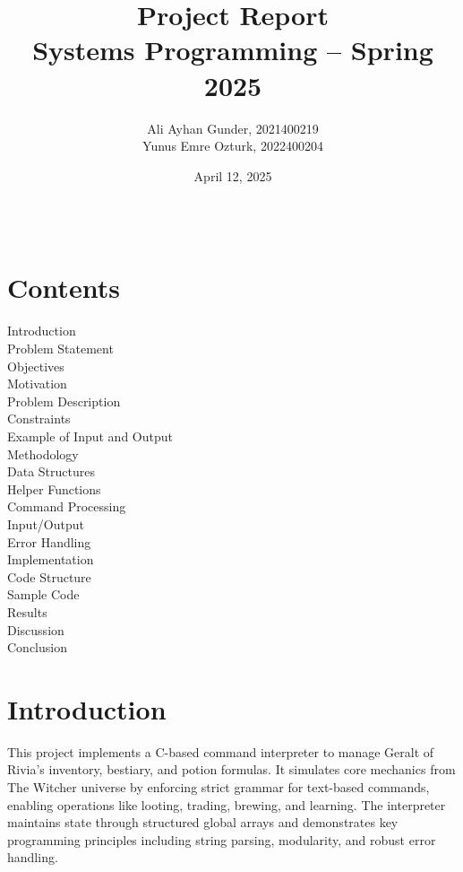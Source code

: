 \documentclass[12pt,a4paper]{article}
\title{Project Report\\Systems Programming – Spring 2025}
\author{Ali Ayhan Gunder, 2021400219\\Yunus Emre Ozturk, 2022400204}
\date{April 12, 2025}
\begin{document}
\maketitle

\begin{verbatim}

\end{verbatim}

\section*{Contents}
\quad Introduction \dotfill \\
\noindent{}\quad Problem Statement \dotfill \\
\noindent{}\quad Objectives \dotfill \\
\noindent{}\quad Motivation \dotfill \\[0.5em]
\quad Problem Description \dotfill \\
\noindent{}\quad Constraints \dotfill \\
\noindent{}\quad Example of Input and Output \dotfill \\[0.5em]
\quad Methodology \dotfill \\
\noindent{}\quad Data Structures \dotfill \\
\noindent{}\quad Helper Functions \dotfill \\
\noindent{}\quad Command Processing \dotfill \\
\noindent{}\quad Input/Output \dotfill \\
\noindent{}\quad Error Handling \dotfill \\[0.5em]
\quad Implementation \dotfill \\
\noindent{}\quad Code Structure \dotfill \\
\noindent{}\quad Sample Code \dotfill \\[0.5em]
\quad Results \dotfill \\[0.5em]
\quad Discussion \dotfill \\[0.5em]
\quad Conclusion \dotfill 


\section{Introduction}
This project implements a C-based command interpreter to manage Geralt of Rivia’s inventory, bestiary, and potion formulas. It simulates core mechanics from The Witcher universe by enforcing strict grammar for text-based commands, enabling operations like looting, trading, brewing, and learning. The interpreter maintains state through structured global arrays and demonstrates key programming principles including string parsing, modularity, and robust error handling.
\end{document}
